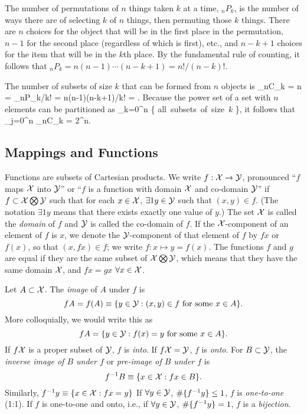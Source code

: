 The number of permutations of $n$ things taken $k$ at a time, ${}_nP_k$,
is the number of ways there are of selecting $k$ of $n$ things, then permuting
those $k$ things.
There are $n$ choices for the object that will be in the first place in the permutation,
$n-1$ for the second place (regardless of which is first), etc., and $n-k+1$ choices
for the item that will be in the $k$th place.
By the fundamental rule of counting, it follows that
${}_nP_k = n(n-1)\cdots(n-k+1) = n!/(n-k)!$.

The number of subsets of size $k$ that can be formed from $n$ objects is
\beq
        {}_nC_k = {{n}} = 
        {}_nP_k/k! = n(n-1)\cdots(n-k+1)/k! = .
\eeq
Because the power set of a set with $n$ elements can be partitioned as
\beq
        \cup_{k=0}^n \left \{ \mbox{all subsets of size $k$}
        \right \},
\eeq
it follows that
\beq
        \sum_{j=0}^n {}_nC_k = 2^n.
\eeq

\subsection{Mappings and Functions}
Functions are subsets of Cartesian products.
We write $f: {\cal X} \rightarrow {\cal Y}$, pronounced ``$f$ maps ${\cal X}$ into ${\cal Y}$''
or ``$f$ is a function with domain ${\cal X}$ and co-domain ${\cal Y}$'' if
$f \subset {\cal X} \bigotimes {\cal Y}$ such that for each $x \in {\cal X}$, $\exists 1 y \in {\cal Y}$
such that $(x, y) \in f$.
(The notation $\exists 1 y$ means that there exists exactly one value of $y$.)
The set ${\cal X}$ is called the {\em domain\/} of $f$ and ${\cal Y}$ is called the co-domain of $f$.
If the ${\cal X}$-component of an element of $f$ is $x$, we denote the ${\cal Y}$-component of that
element of $f$ by $fx$ or $f(x)$, so that $(x, fx) \in f$; we write $f: x \mapsto y=f(x)$.
The functions $f$ and $g$ are equal if they are the same subset of ${\cal X} \bigotimes {\cal Y}$,
which means that they have the same domain ${\cal X}$, and $fx = gx$ $\forall x \in {\cal X}$.

Let $A \subset {\cal X}$.
The {\em image\/} of $A$ under $f$ is
\[
        fA = f(A) \equiv \{ y \in {\cal Y} : (x, y) \in f \mbox{ for some } x \in A\}.
\]
More colloquially, we would write this as
\[
        fA = \{ y \in {\cal Y} : f(x) = y \mbox{ for some } x \in A \}.
\]
If $f{\cal X}$ is a proper subset of ${\cal Y}$, $f$ is {\em into\/}.
If $f{\cal X} = {\cal Y}$, $f$ is {\em onto\/}.
For $B \subset {\cal Y}$, the {\em inverse image of $B$ under $f$\/} or
{\em pre-image of $B$ under $f$\/} is
\[
        f^{-1}B \equiv \{ x \in {\cal X} : fx \in B \}.
\]
Similarly, $f^{-1}y \equiv \{ x \in {\cal X} : fx = y \}$
If $\forall y \in {\cal Y}$, $\mbox{\#} \{ f^{-1} y \} \le 1$, $f$ is {\em one-to-one\/} (1:1).
If $f$ is one-to-one and onto, i.e., if $\forall y \in {\cal Y}$, $\mbox{\#} \{ f^{-1}y \} = 1$,
$f$ is a {\em bijection\/}.


